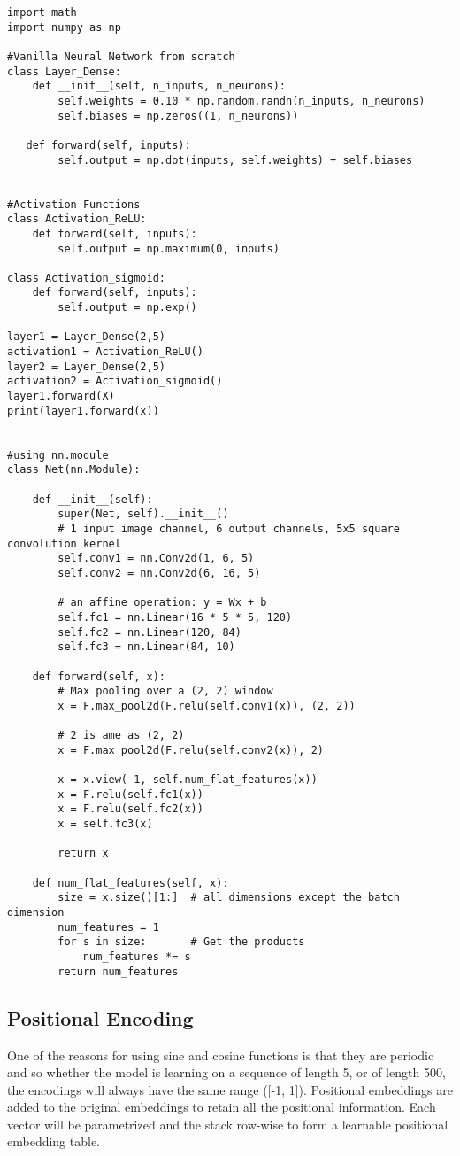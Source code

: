 \documentclass{article}
\begin{document}
\begin{lstlisting}
import math
import numpy as np

#Vanilla Neural Network from scratch
class Layer_Dense:
    def __init__(self, n_inputs, n_neurons):
        self.weights = 0.10 * np.random.randn(n_inputs, n_neurons)
        self.biases = np.zeros((1, n_neurons))

   def forward(self, inputs):
        self.output = np.dot(inputs, self.weights) + self.biases


#Activation Functions
class Activation_ReLU:
    def forward(self, inputs):
        self.output = np.maximum(0, inputs)

class Activation_sigmoid:
    def forward(self, inputs):
        self.output = np.exp()

layer1 = Layer_Dense(2,5)
activation1 = Activation_ReLU()
layer2 = Layer_Dense(2,5)
activation2 = Activation_sigmoid()
layer1.forward(X)
print(layer1.forward(x))


#using nn.module
class Net(nn.Module):

    def __init__(self):
        super(Net, self).__init__()
        # 1 input image channel, 6 output channels, 5x5 square convolution kernel
        self.conv1 = nn.Conv2d(1, 6, 5)
        self.conv2 = nn.Conv2d(6, 16, 5)

        # an affine operation: y = Wx + b
        self.fc1 = nn.Linear(16 * 5 * 5, 120)
        self.fc2 = nn.Linear(120, 84)
        self.fc3 = nn.Linear(84, 10)

    def forward(self, x):
        # Max pooling over a (2, 2) window
        x = F.max_pool2d(F.relu(self.conv1(x)), (2, 2))

        # 2 is ame as (2, 2)
        x = F.max_pool2d(F.relu(self.conv2(x)), 2)

        x = x.view(-1, self.num_flat_features(x))
        x = F.relu(self.fc1(x))
        x = F.relu(self.fc2(x))
        x = self.fc3(x)

        return x

    def num_flat_features(self, x):
        size = x.size()[1:]  # all dimensions except the batch dimension
        num_features = 1
        for s in size:       # Get the products
            num_features *= s
        return num_features
\end{lstlisting}

\clearpage

\subsection{Positional Encoding}
One of the reasons for using sine and cosine functions is that they are periodic and so whether the model is learning on a sequence of length 5, or of length 500, the encodings will always have the same range ([-1, 1]).  Positional embeddings are added to the original embeddings to retain all the positional information. Each vector will be parametrized and the stack row-wise to form a learnable positional embedding table.
\end{document}
